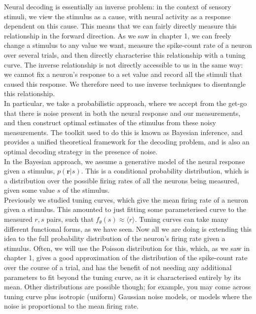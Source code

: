 \documentclass{article}
\begin{document}
Neural decoding is essentially an inverse problem: in the context of sensory stimuli, we view the stimulus as a cause, with neural activity as a response dependent on this cause. This means that we can fairly directly measure this relationship in the forward direction. As we saw in chapter 1, we can freely change a stimulus to any value we want, measure the spike-count rate of a neuron over several trials, and then directly characterise this relationship with a tuning curve. The inverse relationship is not directly accessible to us in the same way: we cannot fix a neuron's response to a set value and record all the stimuli that caused this response. We therefore need to use inverse techniques to disentangle this relationship.\\

In particular, we take a probabilistic approach, where we accept from the get-go that there is noise present in both the neural response and our measurements, and then construct optimal estimates of the stimulus from these noisy measurements. The toolkit used to do this is known as Bayesian inference, and provides a unified theoretical framework for the decoding problem, and is also an optimal decoding strategy in the presence of noise.\\

In the Bayesian approach, we assume a generative model of the neural response given a stimulus, $p(\bm{r}|s)$. This is a conditional probability distribution, which is a distribution over the possible firing rates of all the neurons being measured, given some value $s$ of the stimulus.\\

Previously we studied tuning curves, which give the mean firing rate of a neuron given a stimulus. This amounted to just fitting some parameterised curve to the measured $r, s$ pairs, such that $f_\theta(s) \approx \langle r \rangle$. Tuning curves can take many different functional forms, as we have seen. Now all we are doing is extending this idea to the full probability distribution of the neuron's firing rate given a stimulus. Often, we will use the Poisson distribution for this, which, as we saw in chapter 1, gives a good approximation of the distribution of the spike-count rate over the course of a trial, and has the benefit of not needing any additional parameters to fit beyond the tuning curve, as it is characterised entirely by its mean. Other distributions are possible though; for example, you may come across tuning curve plus isotropic (uniform) Gaussian noise models, or models where the noise is proportional to the mean firing rate.
\end{document}
